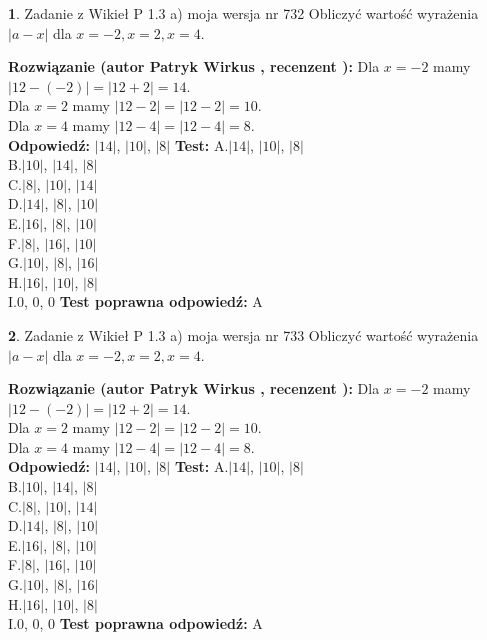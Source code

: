 \documentclass[12pt, a4paper]{article}
\theoremstyle{definition} %
\newtheorem{zad}{}
\newcommand{\zadStart}[1]{\begin{zad}#1\newline}
\newcommand{\zadStop}{\end{zad}}
\newcommand{\rozwStart}[2]{\noindent \textbf{Rozwiązanie (autor #1 , recenzent #2): }\newline}
\newcommand{\rozwStop}{\newline}
\newcommand{\odpStart}{\noindent \textbf{Odpowiedź:}\newline}
\newcommand{\odpStop}{\newline}
\newcommand{\testStart}{\noindent \textbf{Test:}\newline}
\newcommand{\testStop}{\newline}
\newcommand{\kluczStart}{\noindent \textbf{Test poprawna odpowiedź:}\newline}
\newcommand{\kluczStop}{\newline}
\begin{document}
\zadStart{Zadanie z Wikieł P 1.3 a) moja wersja nr 732}
Obliczyć wartość wyrażenia $|a - x|$ dla $x=-2,x=2,x=4$.
\zadStop
\rozwStart{Patryk Wirkus}{}
Dla $x = -2$ mamy $|12 - (-2)| = |12 + 2| = 14$.\\
Dla $x = 2$ mamy $|12 - 2| = |12 - 2| = 10$.\\
Dla $x = 4$ mamy $|12 - 4| = |12 - 4| = 8$.\\
\rozwStop
\odpStart
$|14|$, $|10|$, $|8|$
\odpStop
\testStart
A.$|14|$, $|10|$, $|8|$\\
B.$|10|$, $|14|$, $|8|$\\
C.$|8|$, $|10|$, $|14|$\\
D.$|14|$, $|8|$, $|10|$\\
E.$|16|$, $|8|$, $|10|$\\
F.$|8|$, $|16|$, $|10|$\\
G.$|10|$, $|8|$, $|16|$\\
H.$|16|$, $|10|$, $|8|$\\
I.$0$, $0$, $0$
\testStop
\kluczStart
A
\kluczStop



\zadStart{Zadanie z Wikieł P 1.3 a) moja wersja nr 733}
Obliczyć wartość wyrażenia $|a - x|$ dla $x=-2,x=2,x=4$.
\zadStop
\rozwStart{Patryk Wirkus}{}
Dla $x = -2$ mamy $|12 - (-2)| = |12 + 2| = 14$.\\
Dla $x = 2$ mamy $|12 - 2| = |12 - 2| = 10$.\\
Dla $x = 4$ mamy $|12 - 4| = |12 - 4| = 8$.\\
\rozwStop
\odpStart
$|14|$, $|10|$, $|8|$
\odpStop
\testStart
A.$|14|$, $|10|$, $|8|$\\
B.$|10|$, $|14|$, $|8|$\\
C.$|8|$, $|10|$, $|14|$\\
D.$|14|$, $|8|$, $|10|$\\
E.$|16|$, $|8|$, $|10|$\\
F.$|8|$, $|16|$, $|10|$\\
G.$|10|$, $|8|$, $|16|$\\
H.$|16|$, $|10|$, $|8|$\\
I.$0$, $0$, $0$
\testStop
\kluczStart
A
\kluczStop
\end{document}
